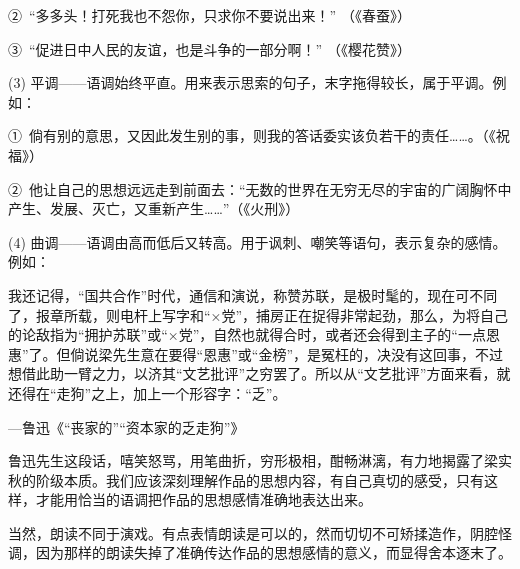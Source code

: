 ②\ “多多头！打死我也不怨你，只求你不要说出来！”
（《春蚕》）

③\ “促进日中人民的友谊，也是斗争的一部分啊！”
（《樱花赞》）

(3) 平调——语调始终平直。用来表示思索的句子，末字拖得较长，属于平调。例如：

①\ 倘有别的意思，又因此发生别的事，则我的答话委实该负若干的责任……。（《祝福》）

②\ 他让自己的思想远远走到前面去：“无数的世界在无穷无尽的宇宙的广阔胸怀中产生、发展、灭亡，又重新产生……”（《火刑》）

(4) 曲调——语调由高而低后又转高。用于讽刺、嘲笑等语句，表示复杂的感情。例如：

我还记得，“国共合作”时代，通信和演说，称赞苏联，是极时髦的，现在可不同了，报章所载，则电杆上写字和“×党”，捕房正在捉得非常起劲，那么，为将自己的论敌指为“拥护苏联”或“×党”，自然也就得合时，或者还会得到主子的“一点恩惠”了。但倘说梁先生意在要得“恩惠”或“金榜”，是冤枉的，决没有这回事，不过想借此助一臂之力，以济其“文艺批评”之穷罢了。所以从“文艺批评”方面来看，就还得在“走狗”之上，加上一个形容字：“乏”。
\begin{flushright}
	---鲁迅《“丧家的”“资本家的乏走狗”》
\end{flushright}

鲁迅先生这段话，嘻笑怒骂，用笔曲折，穷形极相，酣畅淋漓，有力地揭露了梁实秋的阶级本质。我们应该深刻理解作品的思想内容，有自己真切的感受，只有这样，才能用恰当的语调把作品的思想感情准确地表达出来。

当然，朗读不同于演戏。有点表情朗读是可以的，然而切切不可矫揉造作，阴腔怪调，因为那样的朗读失掉了准确传达作品的思想感情的意义，而显得舍本逐末了。
\newpage
